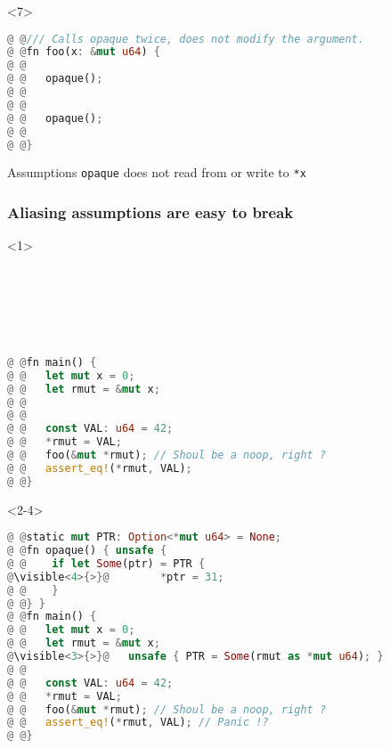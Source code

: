\begin{frame}[fragile,t]
    \begin{onlyenv}<7>
        \begin{block}{}
            \begin{minipage}{\textwidth}
                \begin{lstlisting}[language=rust, escapechar=@]
@ @/// Calls opaque twice, does not modify the argument.
@ @fn foo(x: &mut u64) {
@ @
@ @   opaque();
@ @
@ @
@ @   opaque();
@ @
@ @}
                \end{lstlisting}
            \end{minipage}
        \end{block}
        \begin{block}{Assumptions}
            \texttt{opaque} does not read from or write to \texttt{*x}
        \end{block}
    \end{onlyenv}

\end{frame}

\begin{frame}[fragile]
    \frametitle{Aliasing assumptions are easy to break}
    \begin{onlyenv}<1>
        \begin{block}{}
            \begin{lstlisting}[language=rust, escapechar=@]






@ @fn main() {
@ @   let mut x = 0;
@ @   let rmut = &mut x;
@ @
@ @
@ @   const VAL: u64 = 42;
@ @   *rmut = VAL;
@ @   foo(&mut *rmut); // Shoul be a noop, right ?
@ @   assert_eq!(*rmut, VAL);
@ @}
            \end{lstlisting}
        \end{block}
    \end{onlyenv}

    \begin{onlyenv}<2-4>
        \begin{block}{}
            \begin{lstlisting}[language=rust, escapechar=@]
@ @static mut PTR: Option<*mut u64> = None;
@ @fn opaque() { unsafe {
@ @    if let Some(ptr) = PTR {
@\visible<4>{>}@        *ptr = 31;
@ @    }
@ @} }
@ @fn main() {
@ @   let mut x = 0;
@ @   let rmut = &mut x;
@\visible<3>{>}@   unsafe { PTR = Some(rmut as *mut u64); }
@ @
@ @   const VAL: u64 = 42;
@ @   *rmut = VAL;
@ @   foo(&mut *rmut); // Shoul be a noop, right ?
@ @   assert_eq!(*rmut, VAL); // Panic !?
@ @}
            \end{lstlisting}
        \end{block}
    \end{onlyenv}
\end{frame}

